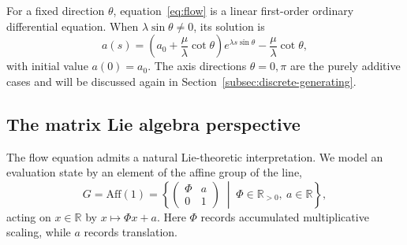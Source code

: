 For a fixed direction $\theta$, equation~\eqref{eq:flow} is a linear first-order ordinary differential equation. When $\lambda\sin\theta\neq 0$, its solution is
\begin{equation}
   a(s) = \left(a_0 + \frac{\mu}{\lambda} \cot \theta\right) e^{\lambda s \sin \theta} - \frac{\mu}{\lambda} \cot \theta,
   \label{eq:solution}
\end{equation}
with initial value $a(0)=a_0$. The axis directions $\theta=0,\pi$ are the purely additive cases and will be discussed again in Section~\ref{subsec:discrete-generating}.

\subsection{The matrix Lie algebra perspective}
\label{subsec:matrix_lie_algebra}

The flow equation admits a natural Lie-theoretic interpretation. We model an evaluation state by an element of the affine group of the line,
\[
G=\mathrm{Aff}(1)=\left\{
\begin{pmatrix}
\Phi & a\\
0 & 1
\end{pmatrix}
\;\middle|\; \Phi\in\mathbb{R}_{>0},\ a\in\mathbb{R}
\right\},
\]
acting on $x\in\mathbb{R}$ by $x\mapsto \Phi x + a$. Here $\Phi$ records accumulated multiplicative scaling, while $a$ records translation.

